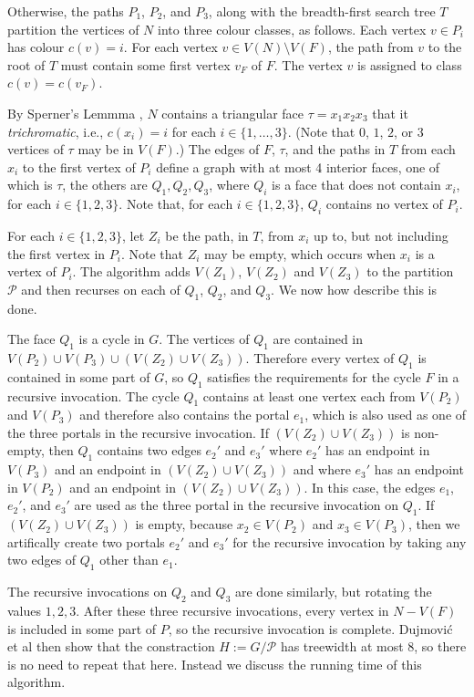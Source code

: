 \documentclass[kpfonts]{patmorin}
\begin{document}
Otherwise, the paths $P_1$, $P_2$, and $P_3$, along with the breadth-first search tree $T$ partition the vertices of $N$ into three colour classes, as follows.  Each vertex $v\in P_i$ has colour $c(v)=i$.  For each vertex $v\in V(N)\setminus V(F)$, the path from $v$ to the root of $T$ must contain some first vertex $v_F$ of $F$.  The vertex $v$ is assigned to class $c(v)=c(v_F)$.

By Sperner's Lemmma \cite{X}, $N$ contains a triangular face $\tau=x_1x_2x_3$ that it \emph{trichromatic}, i.e., $c(x_i)=i$ for each $i\in\{1,\ldots,3\}$. (Note that $0$, $1$, $2$, or $3$ vertices of $\tau$ may be in $V(F)$.)  The edges of $F$, $\tau$, and the paths in $T$ from each $x_i$ to the first vertex of $P_i$ define a graph with at most 4 interior faces, one of which is $\tau$, the others are $Q_1,Q_2,Q_3$, where $Q_i$ is a face that does not contain $x_i$, for each $i\in\{1,2,3\}$.  Note that, for each $i\in\{1,2,3\}$, $Q_i$ contains no vertex of $P_i$.

For each $i\in\{1,2,3\}$, let $Z_i$ be the path, in $T$, from $x_i$ up to, but not including the first vertex in $P_i$.  Note that $Z_i$ may be empty, which occurs when $x_i$ is a vertex of $P_i$.  The algorithm adds $V(Z_1)$, $V(Z_2)$ and $V(Z_3)$ to the partition $\mathcal{P}$ and then recurses on each of $Q_1$, $Q_2$, and $Q_3$.  We now how describe this is done.

The face $Q_1$ is a cycle in $G$.  The vertices of $Q_1$ are contained in $V(P_2)\cup V(P_3)\cup (V(Z_2)\cup V(Z_3))$.  Therefore every vertex of $Q_1$ is contained in some part of $G$, so $Q_1$ satisfies the requirements for the cycle $F$ in a recursive invocation.  The cycle $Q_1$ contains at least one vertex each from $V(P_2)$ and $V(P_3)$ and therefore also contains the portal $e_1$, which is also used as one of the three portals in the recursive invocation.  If $(V(Z_2)\cup V(Z_3))$ is non-empty, then $Q_1$ contains two edges $e_2'$ and $e_3'$ where $e_2'$ has an endpoint in $V(P_3)$ and an endpoint in $(V(Z_2)\cup V(Z_3))$ and where $e_3'$ has an endpoint in $V(P_2)$ and an endpoint in $(V(Z_2)\cup V(Z_3))$.  In this case, the edges $e_1$, $e_2'$, and $e_3'$ are used as the three portal in the recursive invocation on $Q_1$.  If $(V(Z_2)\cup V(Z_3))$ is empty, because $x_2\in V(P_2)$ and $x_3\in V(P_3)$, then we artifically create two portals $e_2'$ and $e_3'$ for the recursive invocation by taking any two edges of $Q_1$ other than $e_1$.

The recursive invocations on $Q_2$ and $Q_3$ are done similarly, but rotating the values $1,2,3$.  After these three recursive invocations, every vertex in $N-V(F)$ is included in some part of $P$, so the recursive invocation is complete.  Dujmović et al then show that the constraction $H:=G/\mathcal{P}$ has treewidth at most 8, so there is no need to repeat that here.  Instead we discuss the running time of this algorithm.
\end{document}
